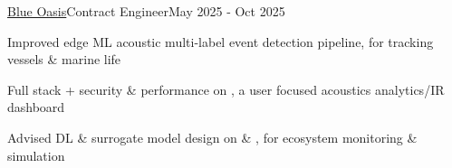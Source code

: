 \documentclass{article}
\newenvironment{**mylist}[4][]%
{%
\subsubsection*{%
    \censor{#2}\tabb #3%
    \if\relax\detokenize{#1}\relax
    \else
      {\;\;(#1)}%
    \fi
    \hfill #4%
}%

\small
  \begin{itemize}%
    \setlength{\topsep}{.2pt}%
    \setlength{\partopsep}{0pt}
    \setlength{\itemsep}{.6pt}%
    \setlength{\parskip}{0pt}%
    \setlength{\parsep}{0pt}%
}%
{%
  \end{itemize}%
}
\begin{document}
\BSec{}%
\begin{**mylist}{\href{https://blueoasis.pt/}{Blue Oasis}}{Contract Engineer}{May 2025 - Oct 2025}
\item Improved edge ML acoustic multi-label event detection pipeline, for tracking vessels \& marine life
\item Full stack + security \& performance on \href{https://hydrotwin.ai/}{}, a user focused acoustics analytics/IR dashboard
\item Advised DL \& surrogate model design on  \& , for ecosystem monitoring \& simulation
\end{**mylist}
\end{document}
